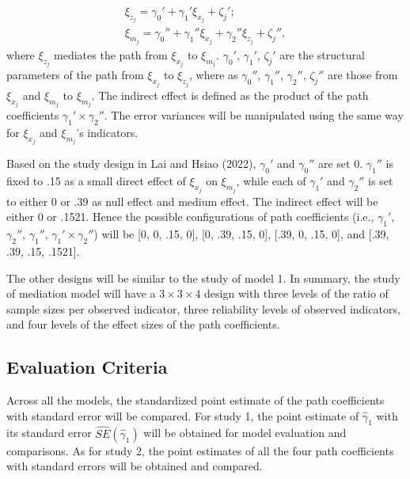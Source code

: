 \documentclass[
  11pt,
  man]{apa6}
\begin{document}
\begin{equation}
\begin{gathered}
\xi_{z_{j}} =  \gamma_{0}' +  \gamma_{1}'\xi_{x_{j}} + \zeta_{j}';\\
\xi_{m_{j}} = \gamma_{0}'' + \gamma_{1}''\xi_{x_{j}} + \gamma_{2}''\xi_{z_{j}} + \zeta_{j}'',
\end{gathered}
\end{equation}
where \(\xi_{z_{j}}\) mediates the path from \(\xi_{x_{j}}\) to \(\xi_{m_{j}}\). \(\gamma_{0}'\), \(\gamma_{1}'\), \(\zeta_{j}'\) are the structural parameters of the path from \(\xi_{x_{j}}\) to \(\xi_{z_{j}}\), where as \(\gamma_{0}''\), \(\gamma_{1}''\), \(\gamma_{2}''\), \(\zeta_{j}''\) are those from \(\xi_{x_{j}}\) and \(\xi_{m_{j}}\) to \(\xi_{m_{j}}\). The indirect effect is defined as the product of the path coefficients \(\gamma_{1}' \times \gamma_{2}''\). The error variances will be manipulated using the same way for \(\xi_{x_{j}}\) and \(\xi_{m_{j}}\)'s indicators.

Based on the study design in Lai and Hsiao (2022), \(\gamma_{0}'\) and \(\gamma_{0}''\) are set 0. \(\gamma_{1}''\) is fixed to .15 as a small direct effect of \(\xi_{x_{j}}\) on \(\xi_{m_{j}}\), while each of \(\gamma_{1}'\) and \(\gamma_{2}''\) is set to either 0 or .39 as null effect and medium effect. The indirect effect will be either 0 or .1521. Hence the possible configurations of path coefficients (i.e., \(\gamma_{1}'\), \(\gamma_{2}''\), \(\gamma_{1}''\), \(\gamma_{1}' \times \gamma_{2}''\)) will be {[}0, 0, .15, 0{]}, {[}0, .39, .15, 0{]}, {[}.39, 0, .15, 0{]}, and {[}.39, .39, .15, .1521{]}.

The other designs will be similar to the study of model 1. In summary, the study of mediation model will have a \(3 \times 3 \times 4\) design with three levels of the ratio of sample sizes per observed indicator, three reliability levels of observed indicators, and four levels of the effect sizes of the path coefficients.

\hypertarget{evaluation-criteria-1}{%
\subsection{Evaluation Criteria}\label{evaluation-criteria-1}}

Across all the models, the standardized point estimate of the path coefficients with standard error will be compared. For study 1, the point estimate of \(\hat{\gamma}_{1}\) with its standard error \(\hat{SE}(\hat{\gamma}_{1})\) will be obtained for model evaluation and comparisons. As for study 2, the point estimates of all the four path coefficients with standard errors will be obtained and compared.
\end{document}
